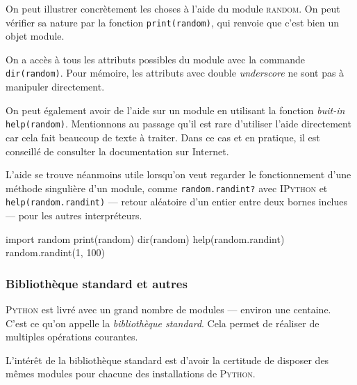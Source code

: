 On peut illustrer concrètement les choses à l'aide du module \textsc{random}. On peut vérifier sa nature par la fonction \texttt{print(random)}, qui renvoie que c'est bien un objet module.

On a accès à tous les attributs possibles du module avec la commande \texttt{dir(random)}. Pour mémoire, les attributs avec double \textit{underscore} ne sont pas à manipuler directement.

On peut également avoir de l'aide sur un module en utilisant la fonction \textit{buit-in} \texttt{help(random)}. Mentionnons au passage qu'il est rare d'utiliser l'aide directement car cela fait beaucoup de texte à traiter. Dans ce cas et en pratique, il est conseillé de consulter la documentation sur Internet. 

L'aide se trouve néanmoins utile lorsqu'on veut regarder le fonctionnement d'une méthode singulière d'un module, comme \texttt{random.randint?} avec \textsc{IPython} et \texttt{help(random.randint)} --- retour aléatoire d'un entier entre deux bornes inclues --- pour les autres interpréteurs.


\begin{idleconsole*}
\begin{pyconsole}[][breaklines]
import random
print(random)
dir(random)
help(random.randint)
random.randint(1, 100)
\end{pyconsole}
\end{idleconsole*}

\subsubsection[Bibliothèque standard et autres]{Bibliothèque standard et autres}
\label{subsub:XI.4.2.2}

\textsc{Python} est livré avec un grand nombre de modules --- environ une centaine. C'est ce qu'on appelle la \emph{bibliothèque standard}. Cela permet de réaliser de multiples opérations courantes. 

L'intérêt de la bibliothèque standard est d'avoir la certitude de disposer des mêmes modules pour chacune des installations de \textsc{Python}. 


